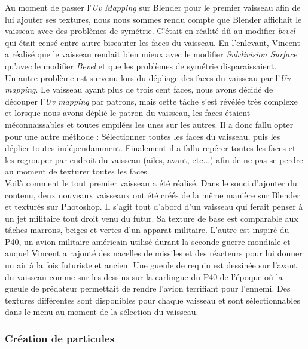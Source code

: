 \documentclass[12pt, titlepage]{article}
\begin{document}
\begin{spacing}{1.5}
Au moment de passer l’\textit{Uv Mapping} sur Blender pour le premier vaisseau afin de lui ajouter ses textures, nous nous sommes rendu compte que Blender affichait le vaisseau avec des problèmes de symétrie. C’était en réalité dû au modifier \textit{bevel} qui était censé entre autre biseauter les faces du vaisseau. En l’enlevant, Vincent a réalisé que le vaisseau rendait bien mieux avec le modifier \textit{Subdivision Surface} qu’avec le modifier \textit{Bevel} et que les problèmes de symétrie disparaissaient.\\

Un autre problème est survenu lors du dépliage des faces du vaisseau par l’\textit{Uv mapping}.
Le vaisseau ayant plus de trois cent faces, nous avons décidé de découper l’\textit{Uv mapping} par patrons, mais cette tâche s’est révélée très complexe et lorsque nous avons déplié le patron du vaisseau, les faces étaient méconnaissables et toutes empilées les unes sur les autres. Il a donc fallu opter pour une autre méthode : Sélectionner toutes les faces du vaisseau, puis les déplier toutes indépendamment. Finalement il a fallu repérer toutes les faces et les regrouper par endroit du vaisseau (ailes, avant, etc...) afin de ne pas se perdre au moment de texturer toutes les faces.\\

Voilà comment le tout premier vaisseau a été réalisé. Dans le souci d'ajouter du contenu, deux nouveaux vaisseaux ont été créés de la même manière sur Blender et texturés sur Photoshop. Il s'agit tout d'abord d'un vaisseau qui ferait penser à un jet militaire tout droit venu du futur. Sa texture de base est comparable aux tâches marrons, beiges et vertes d’un apparat militaire. L'autre est inspiré du P40, un avion militaire américain utilisé durant la seconde guerre mondiale et auquel Vincent a rajouté des nacelles de missiles et des réacteurs pour lui donner un air à la fois futuriste et ancien. Une gueule de requin est dessinée sur l’avant du vaisseau comme sur les dessins sur la carlingue du P40 de l’époque où la gueule de prédateur permettait de rendre l’avion terrifiant pour l’ennemi.
Des textures différentes sont disponibles pour chaque vaisseau et sont sélectionnables dans le menu au moment de la sélection du vaisseau.\\

\subsubsection{Création de particules}


\end{spacing}
\end{document}
